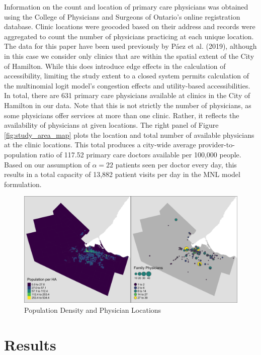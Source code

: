 \documentclass[]{elsarticle} %
\begin{document}
Information on the count and location of primary care physicians was
obtained using the College of Physicians and Surgeons of Ontario's
online registration database. Clinic locations were geocoded based on
their address and records were aggregated to count the number of
physicians practicing at each unique location. The data for this paper
have been used previously by Páez et al. (2019), although in this case
we consider only clinics that are within the spatial extent of the City
of Hamilton. While this does introduce edge effects in the calculation
of accessibility, limiting the study extent to a closed system permits
calculation of the multinomial logit model's congestion effects and
utility-based accessibilities. In total, there are 631 primary care
physicians available at clinics in the City of Hamilton in our data.
Note that this is not strictly the number of physicians, as some
physicians offer services at more than one clinic. Rather, it reflects
the availability of physicians at given locations. The right panel of
Figure \ref{fig:study_area_map} plots the location and total number of
available physicians at the clinic locations. This total produces a
city-wide average provider-to-population ratio of 117.52 primary care
doctors available per 100,000 people. Based on our assumption of
\(\alpha = 22\) patients seen per doctor every day, this results in a
total capacity of 13,882 patient visits per day in the MNL model
formulation.

\begin{figure}
\includegraphics[width=1\linewidth]{./img/study_area_map} \caption{\label{fig:study_area_map}Population Density and Physician Locations}\label{fig:plot study_area_map}
\end{figure}

\hypertarget{results}{%
\section{Results}\label{results}}
\end{document}
